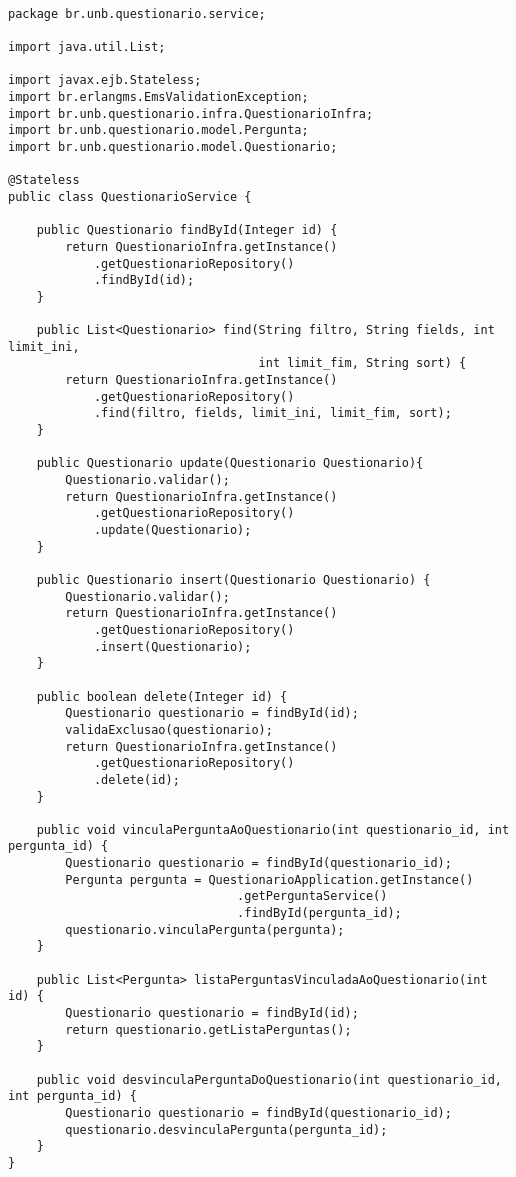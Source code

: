 \begin{lstlisting} 

package br.unb.questionario.service;

import java.util.List;

import javax.ejb.Stateless;
import br.erlangms.EmsValidationException;
import br.unb.questionario.infra.QuestionarioInfra;
import br.unb.questionario.model.Pergunta;
import br.unb.questionario.model.Questionario;

@Stateless
public class QuestionarioService {
	
	public Questionario findById(Integer id) {
		return QuestionarioInfra.getInstance()
			.getQuestionarioRepository()
			.findById(id);
	}

	public List<Questionario> find(String filtro, String fields, int limit_ini, 
								   int limit_fim, String sort) {
		return QuestionarioInfra.getInstance()
			.getQuestionarioRepository()
			.find(filtro, fields, limit_ini, limit_fim, sort);
	}

	public Questionario update(Questionario Questionario){
		Questionario.validar();
		return QuestionarioInfra.getInstance()
			.getQuestionarioRepository()
			.update(Questionario);
	}

	public Questionario insert(Questionario Questionario) {
		Questionario.validar();
		return QuestionarioInfra.getInstance()
			.getQuestionarioRepository()
			.insert(Questionario);
	}
	
	public boolean delete(Integer id) {
		Questionario questionario = findById(id);
		validaExclusao(questionario);
		return QuestionarioInfra.getInstance()
			.getQuestionarioRepository()
			.delete(id);
	}

	public void vinculaPerguntaAoQuestionario(int questionario_id, int pergunta_id) {
		Questionario questionario = findById(questionario_id);
		Pergunta pergunta = QuestionarioApplication.getInstance()
								.getPerguntaService()
								.findById(pergunta_id);
		questionario.vinculaPergunta(pergunta);
	}

	public List<Pergunta> listaPerguntasVinculadaAoQuestionario(int id) {
		Questionario questionario = findById(id);
		return questionario.getListaPerguntas();
	}

	public void desvinculaPerguntaDoQuestionario(int questionario_id, int pergunta_id) {
		Questionario questionario = findById(questionario_id);
		questionario.desvinculaPergunta(pergunta_id);
	}
}

\end{lstlisting}

